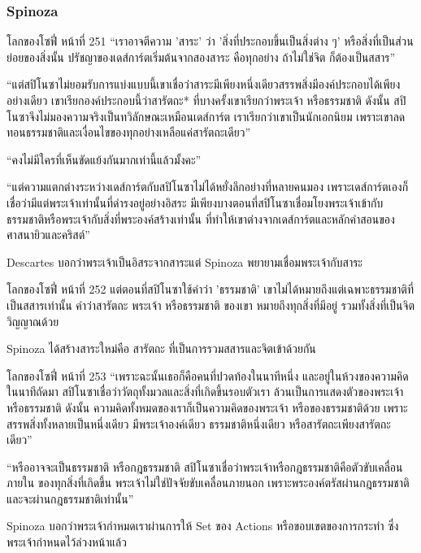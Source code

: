 \subsubsection{Spinoza}

\begin{bookquote}{โลกของโซฟี่ หน้าที่ 251}
“เราอาจตีความ 'สาระ' ว่า 'สิ่งที่ประกอบขึ้นเป็นสิ่งต่าง ๆ' หรือสิ่งที่เป็นส่วนย่อยของสิ่งนั้น ปรัชญาของเดส์การ์ตเริ่มต้นจากสองสาระ คือทุกอย่าง ถ้าไม่ใช่จิต ก็ต้องเป็นสสาร”

“แต่สปิโนซาไม่ยอมรับการแบ่งแบบนี้เขาเชื่อว่าสาระมีเพียงหนึ่งเดียวสรรพสิ่งมีองค์ประกอบได้เพียงอย่างเดียว เขาเรียกองค์ประกอบนี้ว่าสารัตถะ* ที่บางครั้งเขาเรียกว่าพระเจ้า หรือธรรมชาติ ดังนั้น สปิโนซาจึงไม่มองความจริงเป็นทวิลักษณะเหมือนเดส์การ์ต เราเรียกว่าเขาเป็นนักเอกนิยม เพราะเขาลดทอนธรรมชาติและเงื่อนไขของทุกอย่างเหลือแค่สารัตถะเดียว”

“คงไม่มีใครที่เห็นขัดแย้งกันมากเท่านี้แล้วมั้งคะ”

“แต่ความแตกต่างระหว่างเดส์การ์ตกับสปิโนซาไม่ได้หยั่งลึกอย่างที่หลายคนมอง เพราะเดส์การ์ตเองก็เชื่อว่ามีแต่พระเจ้าเท่านั้นที่ดำรงอยู่อย่างอิสระ มีเพียงบางตอนที่สปิโนซาเชื่อมโยงพระเจ้าเข้ากับธรรมชาติหรือพระเจ้ากับสิ่งที่พระองค์สร้างเท่านั้น ที่ทำให้เขาต่างจากเดส์การ์ตและหลักคำสอนของศาสนายิวและคริสต์”
\end{bookquote}

Descartes บอกว่าพระเจ้าเป็นอิสระจากสาระแต่ Spinoza พยายามเชื่อมพระเจ้ากับสาระ

\begin{bookquote}{โลกของโซฟี่ หน้าที่ 252}
แต่ตอนที่สปิโนซาใช้คำว่า 'ธรรมชาติ' เขาไม่ได้หมายถึงแต่เฉพาะธรรมชาติที่เป็นสสารเท่านั้น คำว่าสารัตถะ พระเจ้า หรือธรรมชาติ ของเขา หมายถึงทุกสิ่งที่มีอยู่ รวมทั้งสิ่งที่เป็นจิตวิญญาณด้วย
\end{bookquote}

Spinoza ได้สร้างสาระใหม่คือ สารัตถะ ที่เป็นการรวมสสารและจิตเข้าด้วยกัน

\begin{bookquote}{โลกของโซฟี่ หน้าที่ 253}
“เพราะฉะนั้นเธอก็คือคนที่ปวดท้องในนาทีหนึ่ง และอยู่ในห้วงของความคิดในนาทีถัดมา สปิโนซาเชื่อว่าวัตถุทั้งมวลและสิ่งที่เกิดขึ้นรอบตัวเรา ล้วนเป็นการแสดงตัวของพระเจ้าหรือธรรมชาติ ดังนั้น ความคิดทั้งหมดของเราก็เป็นความคิดของพระเจ้า หรือของธรรมชาติด้วย เพราะสรรพสิ่งทั้งหลายเป็นหนึ่งเดียว มีพระเจ้าองค์เดียว ธรรมชาติหนึ่งเดียว หรือสารัตถะเพียงสารัตถะเดียว”

“หรืออาจจะเป็นธรรมชาติ หรือกฎธรรมชาติ สปิโนซาเชื่อว่าพระเจ้าหรือกฎธรรมชาติคือตัวขับเคลื่อนภายใน ของทุกสิ่งที่เกิดขึ้น พระเจ้าไม่ใช่ปัจจัยขับเคลื่อนภายนอก เพราะพระองค์ตรัสผ่านกฎธรรมชาติ และจะผ่านกฎธรรมชาติเท่านั้น”
\end{bookquote}

Spinoza บอกว่าพระเจ้ากำหมดเราผ่านการให้ Set ของ Actions หรือขอบเขตของการกระทำ ซึ่งพระเจ้ากำหนดไว้ล่วงหน้าแล้ว
